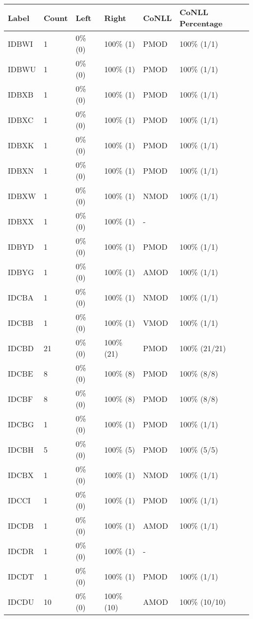 \begin{figure*}
\begin{tabular}{|l|l|l|l||l|l|}
\hline
Label & Count & Left & Right & CoNLL & CoNLL Percentage\\ 
\hline
 IDBWI & 1 & 0\% (0) & 100\% (1) & PMOD & 100\% (1/1) \\ 
\hline
 IDBWU & 1 & 0\% (0) & 100\% (1) & PMOD & 100\% (1/1) \\ 
\hline
 IDBXB & 1 & 0\% (0) & 100\% (1) & PMOD & 100\% (1/1) \\ 
\hline
 IDBXC & 1 & 0\% (0) & 100\% (1) & PMOD & 100\% (1/1) \\ 
\hline
 IDBXK & 1 & 0\% (0) & 100\% (1) & PMOD & 100\% (1/1) \\ 
\hline
 IDBXN & 1 & 0\% (0) & 100\% (1) & PMOD & 100\% (1/1) \\ 
\hline
 IDBXW & 1 & 0\% (0) & 100\% (1) & NMOD & 100\% (1/1) \\ 
\hline
 IDBXX & 1 & 0\% (0) & 100\% (1) & - &  \\ 
\hline
 IDBYD & 1 & 0\% (0) & 100\% (1) & PMOD & 100\% (1/1) \\ 
\hline
 IDBYG & 1 & 0\% (0) & 100\% (1) & AMOD & 100\% (1/1) \\ 
\hline
 IDCBA & 1 & 0\% (0) & 100\% (1) & NMOD & 100\% (1/1) \\ 
\hline
 IDCBB & 1 & 0\% (0) & 100\% (1) & VMOD & 100\% (1/1) \\ 
\hline
 IDCBD & 21 & 0\% (0) & 100\% (21) & PMOD & 100\% (21/21) \\ 
\hline
 IDCBE & 8 & 0\% (0) & 100\% (8) & PMOD & 100\% (8/8) \\ 
\hline
 IDCBF & 8 & 0\% (0) & 100\% (8) & PMOD & 100\% (8/8) \\ 
\hline
 IDCBG & 1 & 0\% (0) & 100\% (1) & PMOD & 100\% (1/1) \\ 
\hline
 IDCBH & 5 & 0\% (0) & 100\% (5) & PMOD & 100\% (5/5) \\ 
\hline
 IDCBX & 1 & 0\% (0) & 100\% (1) & NMOD & 100\% (1/1) \\ 
\hline
 IDCCI & 1 & 0\% (0) & 100\% (1) & PMOD & 100\% (1/1) \\ 
\hline
 IDCDB & 1 & 0\% (0) & 100\% (1) & AMOD & 100\% (1/1) \\ 
\hline
 IDCDR & 1 & 0\% (0) & 100\% (1) & - &  \\ 
\hline
 IDCDT & 1 & 0\% (0) & 100\% (1) & PMOD & 100\% (1/1) \\ 
\hline
 IDCDU & 10 & 0\% (0) & 100\% (10) & AMOD & 100\% (10/10) \\ 

\end{tabular}
\end{figure*}
